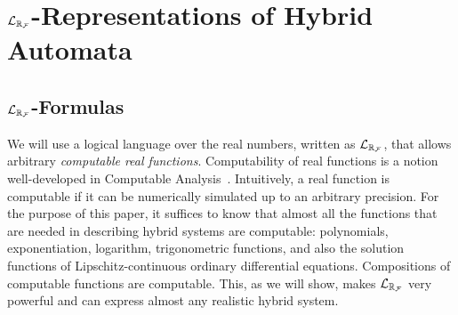 \documentclass[12pt]{article}
\begin{document}




\section{$\mathcal{L}_{\mathbb{R}_{\mathcal{F}}}$-Representations of Hybrid Automata}\label{review}


\subsection{$\mathcal{L}_{\mathbb{R}_{\mathcal{F}}}$-Formulas}
We will use a logical language over the real numbers, written as $\mathcal{L}_{\mathbb{R}_{\mathcal{F}}}$, that allows arbitrary {\em computable real functions}. Computability of real functions is a notion well-developed in Computable Analysis~\cite{CAbook}. Intuitively, a real function is computable if it can be numerically simulated up to an arbitrary precision. For the purpose of this paper, it suffices to know that almost all the functions that are needed in describing hybrid systems are computable: polynomials, exponentiation, logarithm, trigonometric functions, and also the solution functions of Lipschitz-continuous ordinary differential equations. Compositions of computable functions are computable. This, as we will show, makes $\mathcal{L}_{\mathbb{R}_{\mathcal{F}}}$ very powerful and can express almost any realistic hybrid system.
\end{document}
